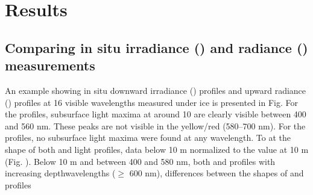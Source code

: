 \section{Results}

\subsection{Comparing in situ \DIFaddbegin {}\DIFaddend irradiance (\ed{}) and \DIFaddbegin {}\DIFaddend radiance (\lu{}) measurements}

An example showing in situ downward irradiance (\ed{}) profiles and upward radiance (\lu{}) profiles at 16 \DIFdelbegin {}\DIFdelend visible wavelengths measured under ice is presented in Fig. \DIFdelbegin {}\DIFdelend \DIFaddbegin {}\DIFaddend For the \ed{} profiles, subsurface light maxima at \DIFaddbegin {}\DIFaddend around 10 \DIFdelbegin {}\DIFdelend \DIFaddbegin {}\DIFaddend are clearly visible between 400 and 560 nm. These peaks are not visible in the yellow/red \DIFdelbegin {}\DIFdelend \DIFaddbegin {}\DIFaddend (580--700 nm). For the \lu{} profiles, no subsurface light maxima were found at any wavelength. To \DIFdelbegin {}\DIFdelend \DIFaddbegin {}\DIFaddend at the shape of both \ed{} and \lu{} light profiles, data below 10 m \DIFdelbegin {}\DIFdelend \DIFaddbegin {}\DIFaddend normalized to the value at 10 m (Fig. \DIFdelbegin {}\DIFdelend \DIFaddbegin {}\DIFaddend ). Below 10 m and between 400 and 580 nm, both \ed{} and \lu{} profiles \DIFdelbegin {}\DIFdelend \DIFaddbegin {}\DIFaddend with increasing depth\DIFdelbegin {}\DIFdelend \DIFaddbegin {}\DIFaddend wavelengths ($\ge$ 600 nm), differences between the shapes of \ed{} and \lu{} profiles \DIFdelbegin {}%

